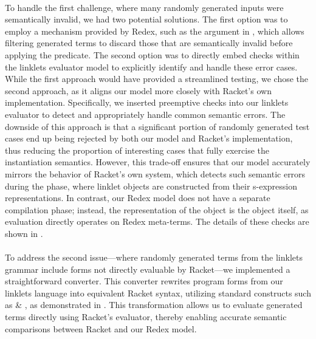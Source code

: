 			\paragraph{}%
				To handle the first challenge, where many randomly generated inputs were semantically invalid, we had two potential solutions. The first option was to employ a mechanism provided by Redex, such as the  argument in , which allows filtering generated terms to discard those that are semantically invalid before applying the predicate. The second option was to directly embed checks within the linklets evaluator model to explicitly identify and handle these error cases. While the first approach would have provided a streamlined testing, we chose the second approach, as it aligns our model more closely with Racket's own implementation. Specifically, we inserted preemptive checks into our linklets evaluator to detect and appropriately handle common semantic errors. The downside of this approach is that a significant portion of randomly generated test cases end up being rejected by both our model and Racket's implementation, thus reducing the proportion of interesting cases that fully exercise the instantiation semantics. However, this trade-off ensures that our model accurately mirrors the behavior of Racket's own system, which detects such semantic errors during the  phase, where linklet objects are constructed from their s-expression representations. In contrast, our Redex model does not have a separate compilation phase; instead, the representation of the object is the object itself, as evaluation directly operates on Redex meta-terms. The details of these checks are shown in .


			\paragraph{}%
				To address the second issue—where randomly generated terms from the linklets grammar include forms not directly evaluable by Racket—we implemented a straightforward converter. This converter rewrites program forms from our linklets language into equivalent Racket syntax, utilizing standard constructs such as  \& , as demonstrated in . This transformation allows us to evaluate generated terms directly using Racket's evaluator, thereby enabling accurate semantic comparisons between Racket and our Redex model.

